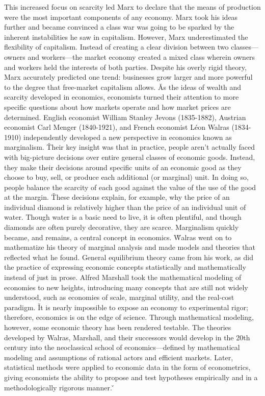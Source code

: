 This increased focus on scarcity led Marx to declare that the means of production were the most important components
of any economy. Marx took his ideas further and became convinced a class war was going to be sparked by the inherent
instabilities he saw in capitalism. However, Marx underestimated the flexibility of capitalism. Instead of creating a
clear division between two classes—owners and workers—the market economy created a mixed class wherein owners and
workers held the interests of both parties. Despite his overly rigid theory, Marx accurately predicted one trend:
businesses grow larger and more powerful to the degree that free-market capitalism allows. \v

As the ideas of wealth and scarcity developed in economics, economists turned their attention to more specific
questions about how markets operate and how market prices are determined. English economist William Stanley Jevons
(1835-1882), Austrian economist Carl Menger (1840-1921), and French economist Léon Walras (1834-1910) independently
developed a new perspective in economics known as marginalism. \v

Their key insight was that in practice, people aren't actually faced with big-picture decisions over entire general
classes of economic goods. Instead, they make their decisions around specific units of an economic good as they
choose to buy, sell, or produce each additional (or marginal) unit. In doing so, people balance the scarcity of each
good against the value of the use of the good at the margin. \v

These decisions explain, for example, why the price of an individual diamond is relatively higher than the price of
an individual unit of water. Though water is a basic need to live, it is often plentiful, and though diamonds are
often purely decorative, they are scarce. Marginalism quickly became, and remains, a central concept in economics. \v

Walras went on to mathematize his theory of marginal analysis and made models and theories that reflected what he
found. General equilibrium theory came from his work, as did the practice of expressing economic concepts
statistically and mathematically instead of just in prose. Alfred Marshall took the mathematical modeling of
economies to new heights, introducing many concepts that are still not widely understood, such as economies of scale,
marginal utility, and the real-cost paradigm. \v

It is nearly impossible to expose an economy to experimental rigor; therefore, economics is on the edge of science.
Through mathematical modeling, however, some economic theory has been rendered testable. The theories developed by
Walras, Marshall, and their successors would develop in the 20th century into the neoclassical school of
economics—defined by mathematical modeling and assumptions of rational actors and efficient markets. Later,
statistical methods were applied to economic data in the form of econometrics, giving economists the ability to
propose and test hypotheses empirically and in a methodologically rigorous manner. \v

